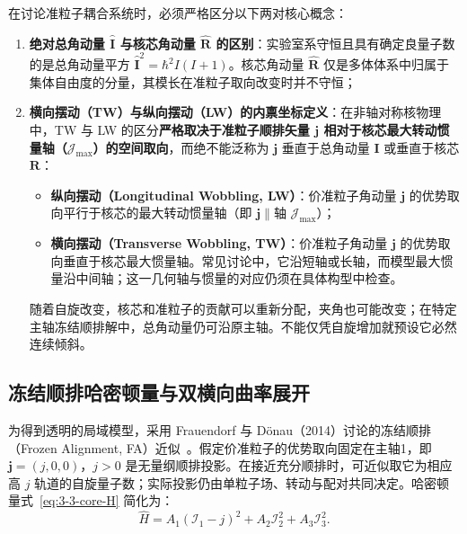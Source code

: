 在讨论准粒子耦合系统时，必须严格区分以下两对核心概念：
\begin{enumerate}
\item \textbf{绝对总角动量 $\hat{\mathbf{I}}$ 与核芯角动量 $\hat{\mathbf{R}}$ 的区别}：实验室系守恒且具有确定良量子数的是总角动量平方 $\hat{\mathbf{I}}^2 = \hbar^2 I(I+1)$。核芯角动量 $\hat{\mathbf{R}}$ 仅是多体体系中归属于集体自由度的分量，其模长在准粒子取向改变时并不守恒；
\item \textbf{横向摆动（TW）与纵向摆动（LW）的内禀坐标定义}：在非轴对称核物理中，TW 与 LW 的区分\textbf{严格取决于准粒子顺排矢量 $\mathbf{j}$ 相对于核芯最大转动惯量轴（$\mathcal{J}_{\text{max}}$）的空间取向}，而绝不能泛称为 $\mathbf{j}$ 垂直于总角动量 $\mathbf{I}$ 或垂直于核芯 $\mathbf{R}$：
\begin{itemize}
\item \textbf{纵向摆动（Longitudinal Wobbling, LW）}：价准粒子角动量 $\mathbf{j}$ 的优势取向平行于核芯的最大转动惯量轴（即 $\mathbf{j} \parallel \text{轴 } \mathcal{J}_{\text{max}}$）；
\item \textbf{横向摆动（Transverse Wobbling, TW）}：价准粒子角动量 $\mathbf{j}$ 的优势取向垂直于核芯最大惯量轴。常见讨论中，它沿短轴或长轴，而模型最大惯量沿中间轴；这一几何轴与惯量的对应仍须在具体构型中检查。
\end{itemize}
随着自旋改变，核芯和准粒子的贡献可以重新分配，夹角也可能改变；在特定主轴冻结顺排解中，总角动量仍可沿原主轴。不能仅凭自旋增加就预设它必然连续倾斜。
\end{enumerate}

\subsection{冻结顺排哈密顿量与双横向曲率展开}\label{sec:3-3-2}

为得到透明的局域模型，采用 Frauendorf 与 D{\"o}nau（2014）讨论的冻结顺排（Frozen Alignment, FA）近似~\cite{frauendorf-2014-transverse-wobbling}。假定价准粒子的优势取向固定在主轴1，即 $\mathbf j=(j,0,0)$，$j>0$ 是无量纲顺排投影。在接近充分顺排时，可近似取它为相应高 $j$ 轨道的自旋量子数；实际投影仍由单粒子场、转动与配对共同决定。哈密顿量式~\eqref{eq:3-3-core-H} 简化为：
\begin{equation}\label{eq:3-3-FA-H}
\hat{H} = A_1 (\mathcal{I}_1 - j)^2 + A_2 \mathcal{I}_2^2 + A_3 \mathcal{I}_3^2.
\end{equation}

